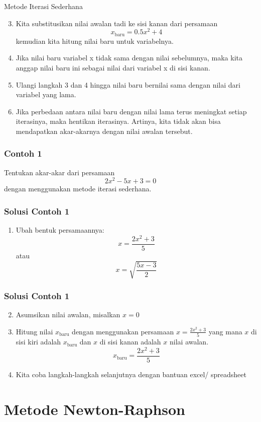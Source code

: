 \documentclass[pdflatex,compress,mathserif]{beamer}
\begin{document}
\begin{frame}{Metode Iterasi Sederhana}
	\begin{enumerate}
		\setcounter{enumi}{2}
		\item Kita substitusikan nilai awalan tadi ke sisi kanan dari persamaan $$ x_{\text{baru}} = 0.5x^2 + 4 $$ kemudian kita hitung nilai baru untuk variabelnya.
		\item Jika nilai baru variabel x tidak sama dengan nilai sebelumnya, maka kita anggap nilai baru ini sebagai nilai dari variabel x di sisi kanan.
		\item Ulangi langkah 3 dan 4 hingga nilai baru bernilai sama dengan nilai dari variabel yang lama.
		\item Jika perbedaan antara nilai baru dengan nilai lama terus meningkat setiap iterasinya, maka hentikan iterasinya. Artinya, kita tidak akan bisa mendapatkan akar-akarnya dengan nilai awalan tersebut.
	\end{enumerate}
\end{frame}

\begin{frame}
	\frametitle{Contoh 1}
	Tentukan akar-akar dari persamaan $$ 2x^2 - 5x + 3 = 0 $$ dengan menggunakan metode iterasi sederhana.
\end{frame}

\begin{frame}
	\frametitle{Solusi Contoh 1}
	\begin{enumerate}
		\item Ubah bentuk persamaannya: $$ x = \frac{2x^2+3}{5} $$ atau $$ x = \sqrt{\frac{5x-3}{2}} $$
	\end{enumerate}
\end{frame}

\begin{frame}
	\frametitle{Solusi Contoh 1}
	\begin{enumerate}\setcounter{enumi}{1}
		\item Asumsikan nilai awalan, misalkan $x = 0$
		\item Hitung nilai $x_{\text{baru}}$ dengan menggunakan persamaan $ x = \frac{2x^2+3}{5} $ yang mana $x$ di sisi kiri adalah $x_{\text{baru}}$ dan $x$ di sisi kanan adalah $x$ nilai awalan. $$ x_{\text{baru}} = \frac{2x^2+3}{5} $$
		\item Kita coba langkah-langkah selanjutnya dengan bantuan excel/ spreadsheet
	\end{enumerate}
\end{frame}

\section{Metode Newton-Raphson}
\end{document}
